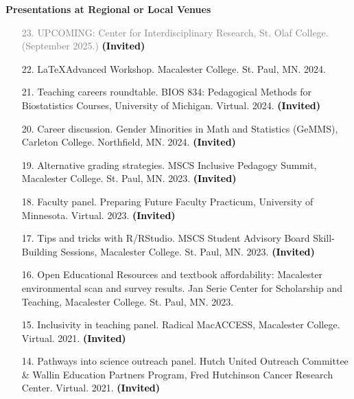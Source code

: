 \documentclass[margin]{res}
\newcommand{\annotate}[1]{\textcolor{black}{\textbf{(#1)}}}
\begin{document}
\begin{resume}
\textbf{Presentations at Regional or Local Venues}

\begin{itemize}

\item[\textcolor{gray}{23.}] \textcolor{gray}{UPCOMING: 
Center for Interdisciplinary Research, St. Olaf College. (September 2025.) 
\annotate{Invited}}

\item[22.] %
\LaTeX Advanced Workshop. 
Macalester College. St. Paul, MN. 2024. %

\item[21.] Teaching careers roundtable. 
BIOS 834: Pedagogical Methods for Biostatistics Courses, University of Michigan.  Virtual.  2024. 
\annotate{Invited}

\item[20.] Career discussion. 
Gender Minorities in Math and Statistics (GeMMS), Carleton College. Northfield, MN. 2024. 
\annotate{Invited}

\item[19.] Alternative grading strategies. 
MSCS Inclusive Pedagogy Summit, Macalester College. St. Paul, MN. 2023.  
\annotate{Invited}

\item[18.] Faculty panel.  
Preparing Future Faculty Practicum, University of Minnesota. Virtual. 2023. 
\annotate{Invited}

\item[17.] Tips and tricks with R/RStudio.  
MSCS Student Advisory Board Skill-Building Sessions, Macalester College. St. Paul, MN. 2023. 
\annotate{Invited}

\item[16.] Open Educational Resources and textbook affordability: Macalester environmental scan and survey results.  
Jan Serie Center for Scholarship and Teaching, Macalester College. St. Paul, MN. 2023.


\item[15.] Inclusivity in teaching panel. 
Radical MacACCESS, Macalester College. Virtual. 2021. 
\annotate{Invited}

\item[14.] Pathways into science outreach panel. 
Hutch United Outreach Committee \& Wallin Education Partners Program, Fred Hutchinson Cancer Research Center. Virtual. 2021. 
\annotate{Invited}


\end{itemize}
\end{resume}
\end{document}
